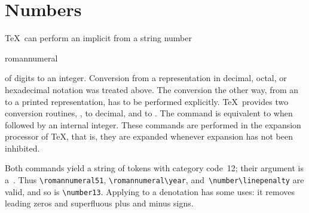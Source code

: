 \documentclass{book}
\begin{document}
\section{Numbers}

\TeX\ can perform an implicit  from a string
\cstoidx number\par\cstoidx romannumeral\par
of digits to an integer. Conversion from a representation
in decimal, octal, or hexadecimal notation was
treated above. The conversion the other way,
from an  to a printed representation,
has to be performed explicitly.
\TeX\ provides two conversion routines,
, to decimal, and  to
.
The command  is equivalent to 
when followed by an internal integer.
These commands are performed in the expansion processor of \TeX, that is,
they are expanded whenever expansion has not been inhibited.

Both commands
yield a string of tokens with category code~12;
their argument is a~.
Thus \verb-\romannumeral51-, \verb-\romannumeral\year-,
and~\verb-\number\linepenalty- are valid, and so is \verb-\number13-.
Applying  to a denotation has some uses:
it removes leading zeros and superfluous plus and minus signs.
\end{document}
